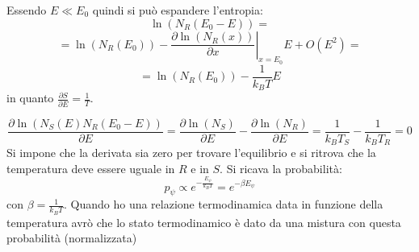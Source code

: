 Essendo $E\ll E_0$ quindi si può espandere l'entropia:
\begin{equation}
\ln{\left(N_R\left(E_0-E\right)\right)}=
\end{equation}
\begin{equation}
=\ln{\left(N_R\left(E_0\right)\right)}-\left.\frac{\partial \ln{\left(N_R\left(x\right)\right)}}{\partial x}\right|_{x=E_0}E+O\left(E^2\right)=
\end{equation}
\begin{equation}
=\ln{\left(N_R\left(E_0\right)\right)}-\frac{1}{k_BT}E
\end{equation}
in quanto $\frac{\partial S}{\partial E}= \frac{1}{T}$.

\begin{equation*}
\frac{\partial \ln{\left(N_S\left(E\right)N_R\left(E_0-E\right)\right)}}{\partial E}
=\frac{\partial \ln{\left(N_S\right)}}{\partial E}-\frac{\partial \ln{\left(N_R\right)}}{\partial E}
=\frac{1}{k_BT_S}-\frac{1}{k_BT_R}=0
\end{equation*}
Si impone che la derivata sia zero per trovare l'equilibrio e si ritrova che la temperatura deve essere uguale in $R$ e in $S$.
Si ricava la probabilità:
\begin{equation}
p_\psi \propto e^{-\frac{E_\psi }{k_BT}}=e^{-\beta E_\psi }
\end{equation}
con $\beta=\frac{1}{k_BT}$.
Quando ho una relazione termodinamica data in funzione della temperatura avrò che lo stato termodinamico è dato da una mistura con questa probabilità (normalizzata)

